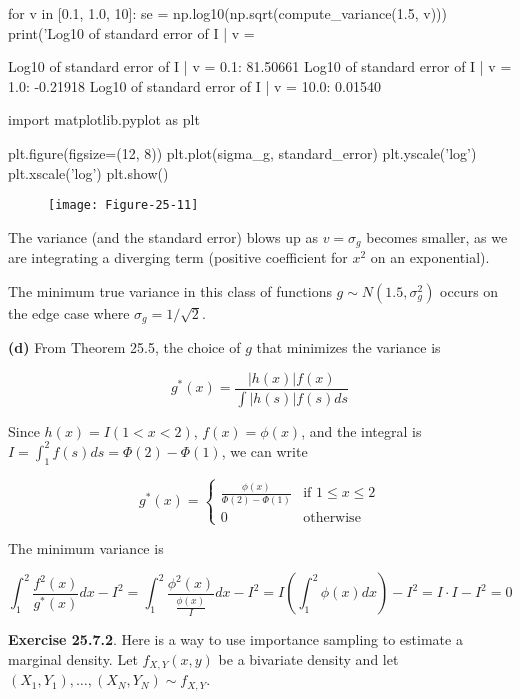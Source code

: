 \begin{python}
for v in [0.1, 1.0, 10]:
    se = np.log10(np.sqrt(compute_variance(1.5, v)))
    print('Log10 of standard error of I | v = %
\end{python}

\begin{console}
Log10 of standard error of I | v = 0.1:   81.50661
Log10 of standard error of I | v = 1.0:   -0.21918
Log10 of standard error of I | v = 10.0:   0.01540
\end{console}

\begin{python}
import matplotlib.pyplot as plt

plt.figure(figsize=(12, 8))
plt.plot(sigma_g, standard_error)
plt.yscale('log')
plt.xscale('log')
plt.show()
\end{python}

\begin{figure}[H]
\centering
\texttt{[image: Figure-25-11]}
\end{figure}

The variance (and the standard error) blows up as \(v = \sigma_g\)
becomes smaller, as we are integrating a diverging term (positive
coefficient for \(x^{2}\) on an exponential).

The minimum true variance in this class of functions
\(g \sim N(1.5, \sigma_g^{2})\) occurs on the edge case where
\(\sigma_g = 1 / \sqrt{2}\).

\textbf{(d)} From Theorem 25.5, the choice of \(g\) that minimizes the
variance is

\[ g^*(x) = \frac{|h(x)| f(x) }{\int | h(s) | f(s)  ds} \]

Since \(h(x) = I(1 < x < 2)\), \(f(x) = \phi(x)\), and the integral is
\(I = \int_{1}^{2} f(s) ds = \Phi(2) - \Phi(1)\), we can write

\[ g^*(x) = \begin{cases}
\frac{\phi(x)}{\Phi(2) - \Phi(1)} &\text{if } 1 \leq x \leq 2 \\
0 &\text{otherwise }
\end{cases}
\]

The minimum variance is

\[ \int_{1}^{2} \frac{f^{2}(x)}{g^*(x)} dx - I^{2} = \int_{1}^{2} \frac{\phi^{2}(x)}{\frac{\phi(x)}{I}} dx - I^{2} = I \left( \int_{1}^{2} \phi(x) dx \right) - I^{2} = I \cdot I - I^{2} = 0 \]

\textbf{Exercise 25.7.2}. Here is a way to use importance sampling to
estimate a marginal density. Let \(f_{X, Y}(x, y)\) be a bivariate
density and let \((X_{1}, Y_{1}), \dots, (X_N, Y_N) \sim f_{X, Y}\).

